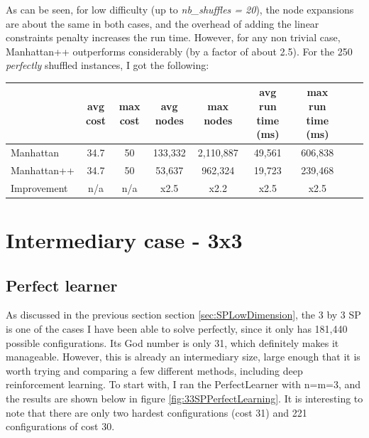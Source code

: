 As can be seen, for low difficulty (up to \textit{nb\_shuffles = 20}), the node expansions are about the same in both cases, and the overhead of adding the linear constraints penalty increases the run time. However, for any non trivial case, Manhattan++ outperforms considerably (by a factor of about 2.5). For the 250 \textit{perfectly} shuffled instances, I got the following:



\begin{center}
\begin{tabular}{l*{7}{c}r}
                              & avg cost  & max cost & avg nodes & max nodes & avg run time (ms) & max run time (ms) \\
\hline
Manhattan                   &  34.7  & 50 & 133,332 & 2,110,887 & 49,561 & 606,838 \\
Manhattan++              & 34.7 &  50 & 53,637 & 962,324 & 19,723 & 239,468 \\
Improvement               & n/a &  n/a & x2.5 & x2.2 & x2.5 & x2.5 \\
\end{tabular}
\end{center}



\section{Intermediary case - 3x3}
\label{sec:S33}


\subsection{Perfect learner}
As discussed in the previous section section \ref{sec:SPLowDimension}, the 3 by 3 SP is one of the cases I have been able to solve perfectly, since it only has 181,440 possible configurations. Its God number is only 31, which definitely makes it manageable. However, this is already an intermediary size, large enough that it is worth trying and comparing a few different methods, including deep reinforcement learning. To start with, I ran the PerfectLearner with n=m=3, and the results are shown below in figure \ref{fig:33SPPerfectLearning}. It is interesting to note that there are only two hardest configurations (cost 31) and 221 configurations of cost 30.


